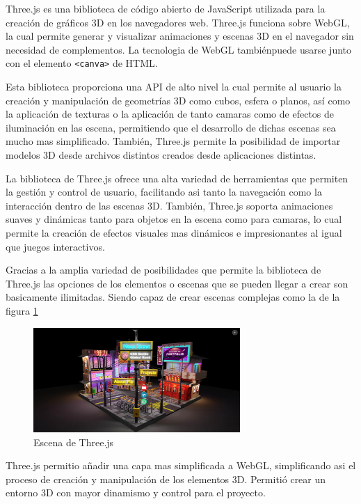 \documentclass[a4paper, 12pt]{book}
\begin{document}
Three.js \cite{webdev_three_intro} es una biblioteca de código abierto de JavaScript utilizada para la creación de gráficos 3D en los navegadores web. Three.js funciona sobre WebGL, la cual permite generar y visualizar animaciones y escenas 3D en el navegador sin necesidad de complementos. La tecnologia de WebGL tambiénpuede usarse junto con el elemento \texttt{<canva>} de HTML.

Esta biblioteca proporciona una API de alto nivel la cual permite al usuario la creación y manipulación de geometrías 3D como cubos, esfera o planos, así como la aplicación de texturas o la aplicación de tanto camaras como de efectos de iluminación en las escena, permitiendo que el desarrollo de dichas escenas sea mucho mas simplificado. 
También, Three.js permite la posibilidad de importar modelos 3D desde archivos distintos creados desde aplicaciones distintas.

La biblioteca de Three.js ofrece una alta variedad de herramientas que permiten la gestión y control de usuario, facilitando asi tanto la navegación como la interacción dentro de las escenas 3D. También, Three.js soporta animaciones suaves y dinámicas tanto para objetos en la escena como para camaras, lo cual permite la creación de efectos visuales mas dinámicos e impresionantes al igual que juegos interactivos. 

Gracias a la amplia variedad de posibilidades que permite la biblioteca de Three.js las opciones de los elementos o escenas que se pueden llegar a crear son basicamente ilimitadas. Siendo capaz de crear escenas complejas como la de la figura \ref{fig:three}
\begin{figure}[H] 
  \centering
  \includegraphics[width=0.7\textwidth]{img/three.jpeg}
  \caption{Escena de Three.js}
  \label{fig:three}
\end{figure}

Three.js permitio añadir una capa mas simplificada a WebGL, simplificando asi el proceso de creación y manipulación de los elementos 3D. Permitió crear un entorno 3D con mayor dinamismo y control para el proyecto.
\end{document}
